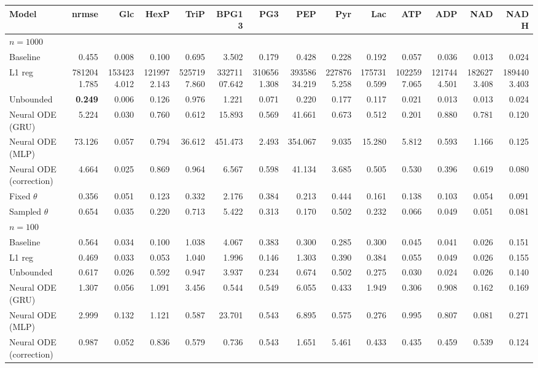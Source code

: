 \begin{tabular}{lrrrrrrrrrrrrr}
\toprule
Model & nrmse & Glc & HexP & TriP & BPG13 & PG3 & PEP & Pyr & Lac & ATP & ADP & NAD & NADH \\
\midrule
\multicolumn{14}{l}{\textbf{$n=1000$}} \\
Baseline & 0.455 & 0.008 & 0.100 & 0.695 & 3.502 & 0.179 & 0.428 & 0.228 & 0.192 & 0.057 & 0.036 & 0.013 & 0.024 \\
L1 reg & 7812041.785 & 1534234.012 & 1219972.143 & 5257197.860 & 33271107.642 & 3106561.308 & 39358634.219 & 2278765.258 & 1757310.599 & 1022597.065 & 1217444.501 & 1826273.408 & 1894403.403 \\
Unbounded & \textbf{0.249} & 0.006 & 0.126 & 0.976 & 1.221 & 0.071 & 0.220 & 0.177 & 0.117 & 0.021 & 0.013 & 0.013 & 0.024 \\
Neural ODE (GRU) & 5.224 & 0.030 & 0.760 & 0.612 & 15.893 & 0.569 & 41.661 & 0.673 & 0.512 & 0.201 & 0.880 & 0.781 & 0.120 \\
Neural ODE (MLP) & 73.126 & 0.057 & 0.794 & 36.612 & 451.473 & 2.493 & 354.067 & 9.035 & 15.280 & 5.812 & 0.593 & 1.166 & 0.125 \\
Neural ODE (correction) & 4.664 & 0.025 & 0.869 & 0.964 & 6.567 & 0.598 & 41.134 & 3.685 & 0.505 & 0.530 & 0.396 & 0.619 & 0.080 \\
Fixed $\theta$ & 0.356 & 0.051 & 0.123 & 0.332 & 2.176 & 0.384 & 0.213 & 0.444 & 0.161 & 0.138 & 0.103 & 0.054 & 0.091 \\
Sampled $\theta$ & 0.654 & 0.035 & 0.220 & 0.713 & 5.422 & 0.313 & 0.170 & 0.502 & 0.232 & 0.066 & 0.049 & 0.051 & 0.081 \\
\midrule
\multicolumn{14}{l}{\textbf{$n=100$}} \\
Baseline & 0.564 & 0.034 & 0.100 & 1.038 & 4.067 & 0.383 & 0.300 & 0.285 & 0.300 & 0.045 & 0.041 & 0.026 & 0.151 \\
L1 reg & 0.469 & 0.033 & 0.053 & 1.040 & 1.996 & 0.146 & 1.303 & 0.390 & 0.384 & 0.055 & 0.049 & 0.026 & 0.155 \\
Unbounded & 0.617 & 0.026 & 0.592 & 0.947 & 3.937 & 0.234 & 0.674 & 0.502 & 0.275 & 0.030 & 0.024 & 0.026 & 0.140 \\
Neural ODE (GRU) & 1.307 & 0.056 & 1.091 & 3.456 & 0.544 & 0.549 & 6.055 & 0.433 & 1.949 & 0.306 & 0.908 & 0.162 & 0.169 \\
Neural ODE (MLP) & 2.999 & 0.132 & 1.121 & 0.587 & 23.701 & 0.543 & 6.895 & 0.575 & 0.276 & 0.995 & 0.807 & 0.081 & 0.271 \\
Neural ODE (correction) & 0.987 & 0.052 & 0.836 & 0.579 & 0.736 & 0.543 & 1.651 & 5.461 & 0.433 & 0.435 & 0.459 & 0.539 & 0.124 \\

\end{tabular}
